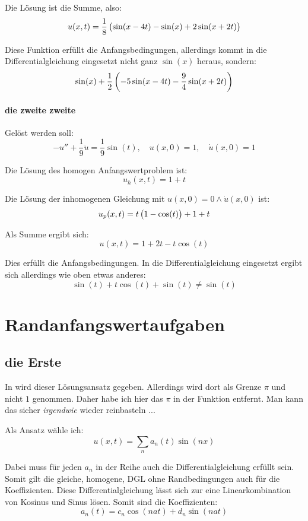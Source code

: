 \documentclass[11pt, ngerman, fleqn]{article}
\newcommand{\half}{\frac 12}
\begin{document}
Die Lösung ist die Summe, also:
\[
	u(x, t)
	= \frac 18 \del{
		\sin(x-4t) - \sin(x) + 2 \sin(x+2t)
	}
\]

Diese Funktion erfüllt die Anfangsbedingungen, allerdings kommt in die
Differentialgleichung eingesetzt nicht ganz $\sin(x)$ heraus, sondern:
\[
	\sin(x) + \half \del{
		- 5 \sin(x-4t) - \frac 94 \sin(x+2t)
	}
\]

\paragraph{die zweite zweite}

Gelöst werden soll:
\[
	- u'' + \frac 19 \ddot u = \frac 19 \sin(t)
	,\quad
	u(x, 0) = 1
	,\quad
	\dot u(x, 0) = 1
\]

Die Lösung des homogen Anfangswertproblem ist:
\[
	u_h(x, t) = 1 + t
\]

Die Lösung der inhomogenen Gleichung mit $u(x, 0) = 0 \wedge \dot u(x, 0)$ ist:
\[
	u_p(x, t) = t \del{
		1 - \cos(t)
	} +1 + t
\]

Als Summe ergibt sich:
\[
	u(x, t) = 1 + 2t - t \cos(t)
\]

Dies erfüllt die Anfangsbedingungen. In die Differentialgleichung eingesetzt
ergibt sich allerdings wie oben etwas anderes:
\[
	\sin(t) + t \cos(t) + \sin(t) \neq \sin(t)
\]


\section{Randanfangswertaufgaben}
\label{sec:3}

\subsection{die Erste}

In \cite[Seite 43]{john-1910} wird dieser Lösungsansatz gegeben. Allerdings wird dort als
Grenze $\pi$ und nicht $1$ genommen. Daher habe ich hier das $\pi$ in der
Funktion entfernt. Man kann das sicher \emph{irgendwie} wieder reinbasteln ...

Als Ansatz wähle ich:
\[
	u(x, t) = \sum_n a_n(t) \sin(nx)
\]

Dabei muss für jeden $a_n$ in der Reihe auch die Differentialgleichung erfüllt
sein. Somit gilt die gleiche, homogene, DGL ohne Randbedingungen auch für die
Koeffizienten. Diese Differentialgleichung lässt sich zur eine
Linearkombination von Kosinus und Sinus lösen. Somit sind die Koeffizienten:
\[
	a_n(t) = c_n \cos(nat) + d_n \sin(nat)
\]
\end{document}
